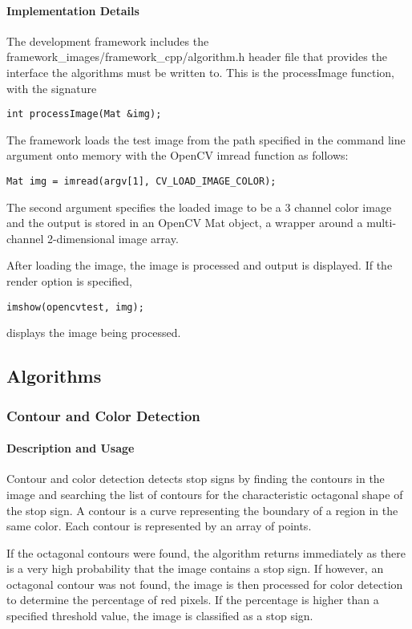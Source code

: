\documentclass[letterpaper,10pt,titlepage]{article}
\begin{document}
\paragraph*{Implementation Details}
The development framework includes the
framework\_images/framework\_cpp/algorithm.h header file that provides the 
interface the algorithms must be written to. This is the processImage function,
with the signature
\begin{lstlisting}
int processImage(Mat &img);
\end{lstlisting}
The framework loads the test image from the path specified in the command line 
argument onto memory with the OpenCV imread function as follows:
\begin{lstlisting}
Mat img = imread(argv[1], CV_LOAD_IMAGE_COLOR);
\end{lstlisting}
The second argument specifies the loaded image to be a 3 channel color image
and the output is stored in an OpenCV Mat object, a wrapper around a 
multi-channel 2-dimensional image array.

After loading the image, the image is processed and output is displayed. If
the render option is specified, 

\begin{lstlisting}
imshow(opencvtest, img);
\end{lstlisting}

displays the image being processed.
\subsection*{Algorithms}

\subsubsection*{Contour and Color Detection}
\paragraph{Description and Usage}
Contour and color detection detects stop signs by finding the contours in the
image and searching the list of contours for the characteristic octagonal 
shape of the stop sign. A contour is a curve representing the boundary of a
region in the same color. Each contour is represented by an array of points.

If the octagonal contours were found, the algorithm returns immediately as 
there is a very high probability that the image contains a stop sign. If 
however, an octagonal contour was not found, the image is then processed for 
color detection to determine the percentage of red pixels. If the percentage is
higher than a specified threshold value, the image is classified as a stop 
sign.
\end{document}

